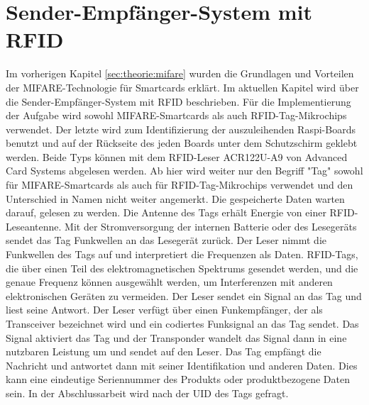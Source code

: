 \section{Sender-Empfänger-System mit RFID}
\label{sec:theorie:rfid}
Im vorherigen Kapitel \ref{sec:theorie:mifare} wurden die Grundlagen und Vorteilen der MIFARE-Technologie für Smartcards erklärt. Im aktuellen Kapitel wird über die  Sender-Empfänger-System mit RFID beschrieben. Für die Implementierung der Aufgabe wird sowohl MIFARE-Smartcards als auch RFID-Tag-Mikrochips verwendet. Der letzte wird zum Identifizierung der auszuleihenden Raspi-Boards benutzt und auf der Rückseite des jeden Boards unter dem Schutzschirm geklebt werden. Beide Typs können mit dem RFID-Leser ACR122U-A9 von Advanced Card Systems abgelesen werden. Ab hier wird weiter nur den Begriff "Tag" sowohl für MIFARE-Smartcards als auch für RFID-Tag-Mikrochips verwendet und den Unterschied in Namen nicht weiter angemerkt. Die gespeicherte Daten warten darauf, gelesen zu werden. Die Antenne des Tags erhält Energie von einer RFID-Leseantenne. Mit der Stromversorgung der internen Batterie oder des Lesegeräts sendet das Tag Funkwellen an das Lesegerät zurück. Der Leser nimmt die Funkwellen des Tags auf und interpretiert die Frequenzen als Daten. RFID-Tags, die über einen Teil des elektromagnetischen Spektrums gesendet werden, und die genaue Frequenz können ausgewählt werden, um Interferenzen mit anderen elektronischen Geräten zu vermeiden. Der Leser sendet ein Signal an das Tag und liest seine Antwort\cite{website:13}. Der Leser verfügt über einen Funkempfänger, der als Transceiver bezeichnet wird und ein codiertes Funksignal an das Tag sendet. Das Signal aktiviert das Tag und der Transponder wandelt das Signal dann in eine nutzbaren Leistung um und sendet auf den Leser. Das Tag empfängt die Nachricht und antwortet dann mit seiner Identifikation und anderen Daten. Dies kann eine eindeutige Seriennummer des Produkts oder produktbezogene Daten sein. In der Abschlussarbeit wird nach der UID des Tags gefragt. 

